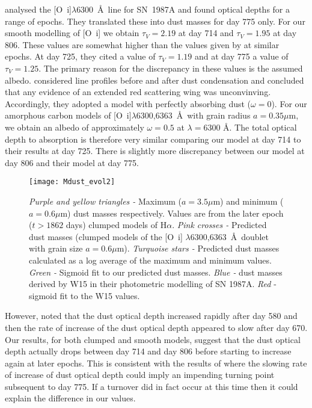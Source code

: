 \citet{Lucy1989b} analysed the [O~{\sc i}]$\lambda$6300~\AA\ line for SN~1987A and found optical depths for a range of epochs. They translated these into dust masses for day 775 only.  
For our smooth modelling of [O~{\sc i}] we obtain $\tau_V=2.19$ at day 714 and $\tau_V=1.95$ at day 806.  These values are somewhat higher than the values given by \citet{Lucy1989b} at similar epochs.  At day 725, they cited a value of $\tau_V=1.19$ and at day 775 a value of $\tau_V=1.25$.  The primary reason for the discrepancy in these values is the assumed albedo.  \citet{Lucy1989b} considered line profiles before and after dust condensation and concluded that any evidence of an extended red scattering wing was unconvinving.  Accordingly, they adopted a model with perfectly absorbing dust ($\omega = 0$).  For our amorphous carbon models of [O~{\sc i}]$\lambda$6300,6363~\AA\ with grain radius $a=0.35\mu$m, we obtain an albedo of approximately $\omega = 0.5$ at $\lambda=6300$ \AA.  The total optical depth to absorption is therefore very similar comparing our model at day 714 to their results at day  725.  There is slightly more discrepancy between our model at day 806 and their model at day 775.  

\begin{figure*}
\begin{center}
\texttt{[image: Mdust\_evol2]}
\caption{\textit{Purple and yellow triangles -} Maximum ($a=3.5\mu$m) and 
minimum ($a=0.6\mu$m) dust masses respectively.  Values are from the 
later epoch ($t>1862$ days) clumped models of H$\alpha$.  \textit{Pink 
crosses - } Predicted dust masses (clumped models of the 
[O~{\sc i}] $\lambda$6300,6363~\AA\ doublet with grain size $a=0.6\mu$m).  
\textit{Turquoise stars -} Predicted dust masses calculated as a log 
average of the maximum and minimum values.  \textit{Green -} Sigmoid fit 
to our predicted dust masses. \textit{Blue - } dust masses derived by W15 
in their photometric modelling of SN 1987A. \textit{Red} - sigmoid fit to 
the W15 values.}
\label{Mdust}
\end{center}
\end{figure*}

However, \citet{Lucy1989b} noted that the dust optical depth increased rapidly after day 580 and then the rate of increase of the dust optical depth appeared to slow after day 670.  Our results, for both clumped and smooth models, suggest that the dust optical depth actually drops between day 714 and day 806 before starting to increase again at later epochs.  This is consistent with the results of \citet{Lucy1989b} where the slowing rate of increase of dust optical depth could imply an impending turning point subsequent to day 775.  If a turnover did in fact occur at this time then it could explain the difference in our values.

